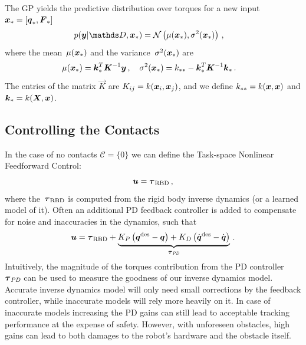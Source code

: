     The GP yields the predictive distribution over torques for a new input $\boldsymbol{x}_* = [\boldsymbol{q}_*, \boldsymbol F_*]$
	\begin{align*}
		&\prob(\vec y|\dataset,\parameters_*) = \gauss{\mu(\parameters_*)}{\sigma^2(\parameters_*)}\,, 
	\end{align*}
	where the mean~$\mu(\boldsymbol{x}_*)$ and the variance~$\sigma^2(\boldsymbol{x}_*)$ are 
	\begin{align*}
		&\mu(\boldsymbol{x}_*) = \boldsymbol{k}^T_*\boldsymbol{K}^{-1} \boldsymbol y\,,\quad \sigma^2(\boldsymbol{x}_*) = k_{**}-\boldsymbol{k}^T_*\boldsymbol K^{-1}\boldsymbol{k}_*\,.
	\end{align*}
	The entries of the matrix $\vec K$ are  $K_{ij}= k(\boldsymbol{x}_i,\boldsymbol{x}_j)$, and we define $k_{**}=k(\boldsymbol{x},\boldsymbol{x})$ and $\boldsymbol{k}_{*}=k(\boldsymbol{X},\boldsymbol{x})$. 


\subsection{Controlling the Contacts}

In the case of no contacts $\mathcal{C}=\{0\}$ we can define the Task-space Nonlinear Feedforward Control:
%
\begin{align}
	\boldsymbol{u} = \boldsymbol{\tau}_\text{RBD}\,,
\end{align}
%
where the~$\boldsymbol{\tau}_\text{RBD}$ is computed from the rigid body inverse dynamics (or a learned model of it).
Often an additional PD feedback controller is added to compensate for noise and inaccuracies in the dynamics, such that
%
\begin{align}
	\boldsymbol{u} = \boldsymbol{\tau}_\text{RBD} + \underbrace{K_P \left(\boldsymbol q^{\text{des}}-\boldsymbol q\right) + K_D \left(\dot{\boldsymbol q}^{\text{des}} - \dot{\boldsymbol q}\right)}_{\boldsymbol{\tau}_\textit{PD}}\,.
\end{align}
%
Intuitively, the magnitude of the torques contribution from the PD controller~$\boldsymbol{\tau}_\textit{PD}$ can be used to measure the goodness of our inverse dynamics model.
Accurate inverse dynamics model will only need small corrections by the feedback controller, while inaccurate models will rely more heavily on it.
In case of inaccurate models increasing the PD gains can still lead to acceptable tracking performance at the expense of safety.
However, with unforeseen obstacles, high gains can lead to both damages to the robot's hardware and the obstacle itself.

